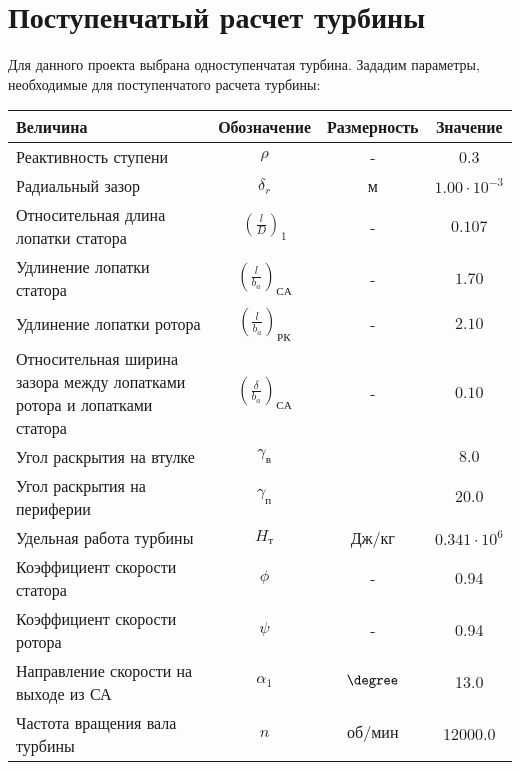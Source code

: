 \section{Поступенчатый расчет турбины}
Для данного проекта выбрана одноступенчатая турбина.
Зададим параметры, необходимые для поступенчатого расчета турбины:

\begin{center}
	\begin{longtable}{|p{4cm}|c|c|c|}
		\hline
		\textbf{Величина} & \textbf{Обозначение} & \textbf{Размерность} & \textbf{Значение} \\ \hline
			Реактивность ступени & $\rho$ & - & 0.3  \\ \hline
			Радиальный зазор & $\delta_r$ & м & $1.00 \cdot 10^{-3}$ \\ \hline
			Относительная длина лопатки статора & $\left( \frac{l}{D} \right)_1$ & - & $0.107$ \\ \hline
			Удлинение лопатки статора & $\left( \frac{l}{b_a} \right)_{СА}$ & - & $1.70$ \\ \hline
			Удлинение лопатки ротора & $\left( \frac{l}{b_a} \right)_{РК}$ & - & $2.10$ \\ \hline
			Относительная ширина зазора между лопатками ротора и лопатками статора & $\left( \frac{\delta}{b_a} \right)_{СА}$ & - & $0.10$ \\ \hline
			Угол раскрытия на втулке & $\gamma_{в}$ & \degree & $8.0$ \\ \hline
			Угол раскрытия на периферии & $\gamma_{п}$ & \degree & $20.0$ \\ \hline
			Удельная работа турбины & $H_т$ & Дж/кг & $0.341 \cdot 10^6$ \\ \hline
			Коэффициент скорости статора & $\phi$ & - & 0.94 \\ \hline
			Коэффициент скорости ротора & $\psi$ & - & 0.94 \\ \hline
			Направление скорости на выходе из СА & $\alpha_1$ & $\degree$ & 13.0 \\ \hline
			Частота вращения вала турбины & $n$ & $об/мин$ & 12000.0 \\ \hline
	\end{longtable}
\end{center}

\clearpage

